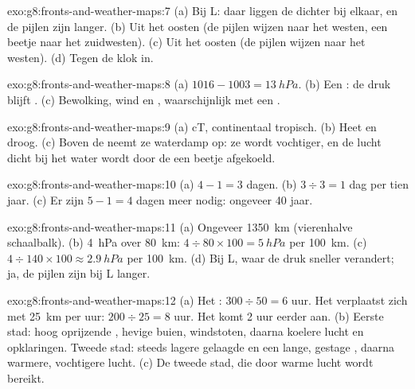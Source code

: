 \begin{solution}{exo:g8:fronts-and-weather-maps:7}
(a) Bij L: daar liggen de  dichter bij elkaar, en de pijlen zijn
langer. (b) Uit het oosten (de pijlen wijzen naar het westen, een beetje
naar het zuidwesten). (c) Uit het oosten (de pijlen wijzen naar het
westen). (d) Tegen de klok in.
\end{solution}

\begin{solution}{exo:g8:fronts-and-weather-maps:8}
(a) $1016 - 1003 = \qty{13}{hPa}$. (b) Een : de druk blijft .
(c) Bewolking, wind en , waarschijnlijk met een .
\end{solution}

\begin{solution}{exo:g8:fronts-and-weather-maps:9}
(a) cT, continentaal tropisch. (b) Heet en droog. (c) Boven de  neemt
ze waterdamp op: ze wordt vochtiger, en de lucht dicht bij het water wordt
door de  een beetje afgekoeld.
\end{solution}

\begin{solution}{exo:g8:fronts-and-weather-maps:10}
(a) $4 - 1 = 3$ dagen. (b) $3 \div 3 = 1$ dag per tien jaar. (c) Er zijn
$5 - 1 = 4$ dagen meer nodig: ongeveer 40 jaar.
\end{solution}

\begin{solution}{exo:g8:fronts-and-weather-maps:11}
(a) Ongeveer \qty{1350}{km} (vierenhalve schaalbalk). (b) \qty{4}{hPa}
over \qty{80}{km}: $4 \div 80 \times 100 = \qty{5}{hPa}$ per
\qty{100}{km}. (c) $4 \div 140 \times 100 \approx \qty{2.9}{hPa}$ per
\qty{100}{km}. (d) Bij L, waar de druk sneller verandert; ja, de pijlen
zijn bij L langer.
\end{solution}

\begin{solution}{exo:g8:fronts-and-weather-maps:12}
(a) Het : $300 \div 50 = 6$ uur. Het  verplaatst zich
met \qty{25}{km} per uur: $200 \div 25 = 8$ uur. Het  komt 2 uur
eerder aan. (b) Eerste stad: hoog oprijzende , hevige buien,
windstoten, daarna koelere lucht en opklaringen. Tweede stad:
steeds lagere gelaagde  en een lange, gestage , daarna warmere,
vochtigere lucht. (c) De tweede stad, die door warme lucht wordt bereikt.
\end{solution}

